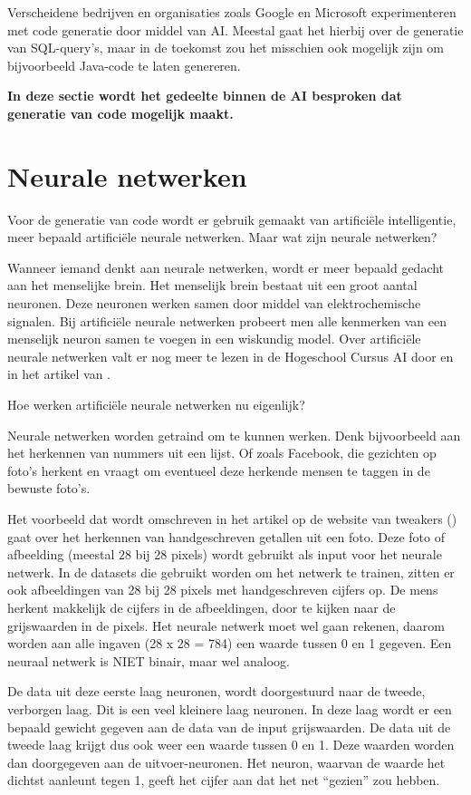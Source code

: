 Verscheidene bedrijven en organisaties zoals Google en Microsoft experimenteren met code generatie door middel van AI. Meestal gaat het hierbij over de generatie van SQL-query's, maar in de toekomst zou het misschien ook mogelijk zijn om bijvoorbeeld Java-code te laten genereren. 

\textbf{In deze sectie wordt het gedeelte binnen de AI besproken dat generatie van code mogelijk maakt.}
\section{Neurale netwerken}

Voor de generatie van code wordt er gebruik gemaakt van artificiële intelligentie, meer bepaald artificiële neurale netwerken. Maar wat zijn neurale netwerken? 

Wanneer iemand denkt aan neurale netwerken, wordt er meer bepaald gedacht aan het menselijke brein. Het menselijk brein bestaat uit een groot aantal neuronen. Deze neuronen werken samen door middel van elektrochemische signalen. Bij artificiële neurale netwerken probeert men alle kenmerken van een menselijk neuron samen te voegen in een wiskundig model. Over artificiële neurale netwerken valt er nog meer te lezen in de Hogeschool Cursus AI door \textcite{cursusAI} en in het artikel van \textcite{techpulse}.

Hoe werken artificiële neurale netwerken nu eigenlijk? 

Neurale netwerken worden getraind om te kunnen werken. Denk bijvoorbeeld aan het herkennen van nummers uit een lijst. Of zoals Facebook, die gezichten op foto’s herkent en vraagt om eventueel deze herkende mensen te taggen in de bewuste foto’s. 

Het voorbeeld dat wordt omschreven in het artikel op de website van tweakers (\textcite{tweakers}) gaat over het herkennen van handgeschreven getallen uit een foto. Deze foto of afbeelding (meestal 28 bij 28 pixels) wordt gebruikt als input voor het neurale netwerk. In de datasets die gebruikt worden om het netwerk te trainen, zitten er ook afbeeldingen van 28 bij 28 pixels met handgeschreven cijfers op. De mens herkent makkelijk de cijfers in de afbeeldingen, door te kijken naar de grijswaarden in de pixels. Het neurale netwerk moet wel gaan rekenen, daarom worden aan alle ingaven (28 x 28 = 784) een waarde tussen 0 en 1 gegeven. Een neuraal netwerk is NIET binair, maar wel analoog. 

De data uit deze eerste laag neuronen, wordt doorgestuurd naar de tweede, verborgen laag. Dit is een veel kleinere laag neuronen. In deze laag wordt er een bepaald gewicht gegeven aan de data van de input grijswaarden. De data uit de tweede laag krijgt dus ook weer een waarde tussen 0 en 1. Deze waarden worden dan doorgegeven aan de uitvoer-neuronen. Het neuron, waarvan de waarde het dichtst aanleunt tegen 1, geeft het cijfer aan dat het net “gezien” zou hebben. 

